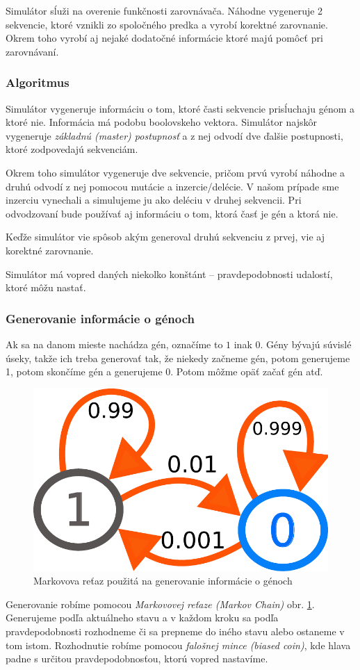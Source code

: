 Simulátor sĺuži na overenie funkčnosti zarovnávača. Náhodne vygeneruje 2 sekvencie, ktoré vznikli zo spoločného predka a vyrobí korektné zarovnanie. Okrem toho vyrobí aj nejaké dodatočné informácie ktoré majú pomôcť pri zarovnávaní.

\subsubsection{Algoritmus}
Simulátor vygeneruje informáciu o tom, ktoré časti sekvencie prisĺuchaju génom a ktoré nie. Informácia má podobu boolovskeho vektora.
Simulátor najskôr vygeneruje \textit{základnú (master) postupnosť} a z nej odvodí dve ďalšie postupnosti, ktoré zodpovedajú sekvenciám.

Okrem toho simulátor vygeneruje dve sekvencie, pričom prvú vyrobí náhodne a druhú odvodí z nej pomocou mutácie a inzercie/delécie.
V našom prípade sme inzerciu vynechali a simulujeme ju ako deléciu v druhej sekvencii.
Pri odvodzovaní bude používať aj informáciu o tom, ktorá časť je gén a ktorá nie.

Keďže simulátor vie spôsob akým generoval druhú sekvenciu z prvej, vie aj korektné zarovnanie.

Simulátor má vopred daných niekolko konštánt -- pravdepodobnosti udalostí, ktoré môžu nastať.

\subsubsection{Generovanie informácie o génoch}
Ak sa na danom mieste nachádza gén, označíme to $1$ inak $0$.
Gény bývajú súvislé úseky, takže ich treba generovať tak, že niekedy začneme gén, potom generujeme 1, potom skončíme gén a generujeme 0. Potom môžme opäť začať gén atď.

\begin{figure}[htp]
    \centering
    \includegraphics[width=.3\textwidth]{images/markov_chain}
    \caption{Markovova reťaz použitá na generovanie informácie o génoch}
    \label{fig:markov-chain}
\end{figure}

Generovanie robíme pomocou \textit{Markovovej reťaze (Markov Chain)} obr. \ref{fig:markov-chain}. Generujeme podľa aktuálneho stavu a v každom kroku sa podľa pravdepodobnosti rozhodneme či sa prepneme do iného stavu alebo ostaneme v tom istom. Rozhodnutie robíme pomocou \textit{falošnej mince (biased coin)}, kde hlava padne s určitou pravdepodobnosťou, ktorú vopred nastavíme.

